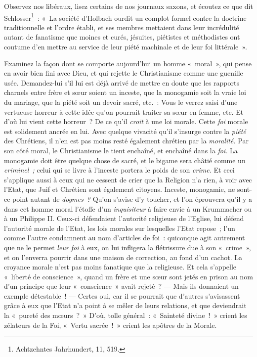 \documentclass[french,twoside]{book} %
\begin{document}
Observez nos libéraux, lisez certains de nos journaux saxons, et écoutez ce que dit Schlosser\footnote{ \noindent Achtzehntes Jahrhundert, 11, 519.
 } : « La société d’Holbach ourdit un complot formel contre la doctrine traditionnelle et l’ordre établi, et ses membres mettaient dans leur incrédulité autant de fanatisme que moines et curés, jésuites, piétistes et méthodistes ont coutume d’en mettre au service de leur piété machinale et de leur foi littérale ».\par
Examinez la façon dont se comporte aujourd’hui un homme « moral », qui pense en avoir bien fini avec Dieu, et qui rejette le Christianisme comme une guenille usée. Demandez-lui s’il lui est déjà arrivé de mettre en doute que les rapports charnels entre frère et sœur soient un inceste, que la monogamie soit la vraie loi du mariage, que la piété soit un devoir sacré, etc. : Vous le verrez saisi d’une vertueuse horreur à cette idée qu’on pourrait traiter sa sœur  en femme, etc. Et d’où lui vient cette horreur ? De ce qu’il \emph{croit} à une loi morale. Cette \emph{foi} morale est solidement ancrée en lui. Avec quelque vivacité qu’il s’insurge contre la \emph{piété} des Chrétiens, il n’en est pas moins resté également chrétien par la \emph{moralité.} Par son côté moral, le Christianisme le tient enchaîné, et enchaîné dans la \emph{foi.} La monogamie doit être quelque chose de sacré, et le bigame sera châtié comme un \emph{criminel ;} celui qui se livre à l’inceste portera le poids de son \emph{crime.} Et ceci s’applique aussi à ceux qui ne cessent de crier que la Religion n’a rien, à voir avec l’Etat, que Juif et Chrétien sont également citoyens. Inceste, monogamie, ne sont-ce point autant de \emph{dogmes ?} Qu’on s’avise d’y toucher, et l’on éprouvera qu’il y a dans cet homme moral l’étoffe d’un \emph{inquisiteur} à faire envie à un Krummacher ou à un Philippe II. Ceux-ci défendaient l’autorité religieuse de l’Eglise, lui défend l’autorité morale de l’Etat, les lois morales sur lesquelles l’Etat repose ; l’un comme l’autre condamnent au nom d’articles de foi : quiconque agit autrement que ne le permet \emph{leur foi} à eux, on lui infligera la flétrissure due à son « crime », et on l’enverra pourrir dans une maison de correction, au fond d’un cachot. La croyance morale n’est pas moins fanatique que la religieuse. Et cela s’appelle « liberté de conscience », quand un frère et une sœur sont jetés en prison au nom d’un principe que leur « conscience » avait rejeté ? — Mais ils donnaient un exemple détestable ! — Certes oui, car il se pourrait que d’autres s’avisassent grâce à eux que l’Etat n’a point à se mêler de leurs relations, et que deviendrait la « pureté des mœurs ? » D’où, tolle général : « Sainteté divine ! » crient les zélateurs de la Foi, « Vertu sacrée ! » crient les apôtres de la Morale.\par
\end{document}
